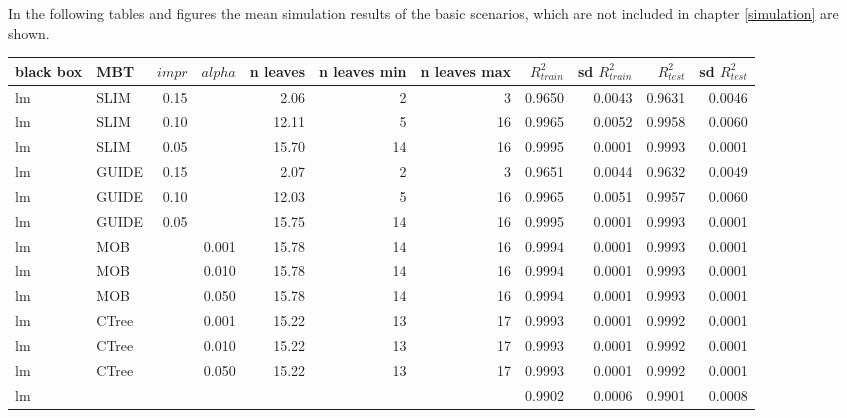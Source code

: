 \clearpage

In the following tables and figures the mean simulation results of the basic scenarios, which are not included in chapter \ref{simulation} are shown.
\begin{table}[!htb]
\centering \tiny
\begin{tabular}[t]{l|l|r|r|r|r|r|r|r|r|r}
\hline
black box & MBT & $impr$ & $alpha$ & n leaves & n leaves min & n leaves max &  $R^2_{train}$ & sd $R^2_{train}$ & $R^2_{test}$ & sd $R^2_{test}$\\
\hline
lm & SLIM & 0.15 & & 2.06 & 2 & 3 & 0.9650 & 0.0043 & 0.9631 & 0.0046\\
lm & SLIM & 0.10 & & 12.11 & 5 & 16 & 0.9965 & 0.0052 & 0.9958 & 0.0060\\
lm & SLIM & 0.05 & & 15.70 & 14 & 16 & 0.9995 & 0.0001 & 0.9993 & 0.0001\\
lm & GUIDE & 0.15 & & 2.07 & 2 & 3 & 0.9651 & 0.0044 & 0.9632 & 0.0049\\
lm & GUIDE & 0.10 & & 12.03 & 5 & 16 & 0.9965 & 0.0051 & 0.9957 & 0.0060\\
lm & GUIDE & 0.05 & & 15.75 & 14 & 16 & 0.9995 & 0.0001 & 0.9993 & 0.0001\\
lm & MOB & & 0.001 & 15.78 & 14 & 16 & 0.9994 & 0.0001 & 0.9993 & 0.0001\\
lm & MOB & & 0.010 & 15.78 & 14 & 16 & 0.9994 & 0.0001 & 0.9993 & 0.0001\\
lm & MOB & & 0.050 & 15.78 & 14 & 16 & 0.9994 & 0.0001 & 0.9993 & 0.0001\\
lm & CTree & & 0.001 & 15.22 & 13 & 17 & 0.9993 & 0.0001 & 0.9992 & 0.0001\\
lm & CTree & & 0.010 & 15.22 & 13 & 17 & 0.9993 & 0.0001 & 0.9992 & 0.0001\\
lm & CTree & & 0.050 & 15.22 & 13 & 17 & 0.9993 & 0.0001 & 0.9992 & 0.0001\\
\hline
lm &  & & & & &  & 0.9902 & 0.0006 & 0.9901 & 0.0008\\
\hline


\end{tabular}
\end{table}
